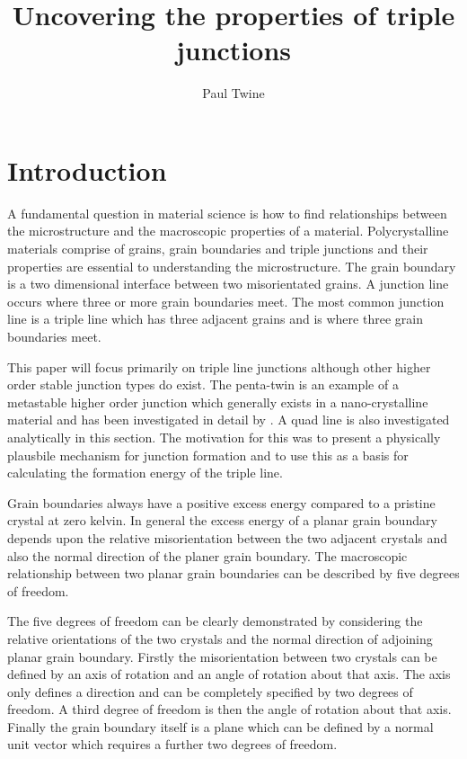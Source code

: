 \documentclass[12pt,a4paper]{book}
\title{Uncovering the properties of triple junctions}
\author{Paul Twine}
\begin{document}
\maketitle

\chapter{Introduction}

A fundamental question in material science is how to find relationships between the microstructure and the macroscopic properties of a material. Polycrystalline materials comprise of grains, grain boundaries and triple junctions and their properties are essential to understanding the microstructure. The grain boundary is a two dimensional interface between two misorientated grains. A junction line occurs where three or more grain boundaries meet. The most common junction line is a triple line which has three adjacent grains and is where three grain boundaries meet. 

This paper will focus primarily on triple line junctions although other higher order stable junction types do exist. The penta-twin is an example of a metastable higher order junction which generally exists in a nano-crystalline material and has been investigated in detail by \cite{Thomas2016}. A quad line is also investigated analytically in this section. The motivation for this was to present a physically plausbile mechanism for junction formation and to use this as a basis for calculating the formation energy of the triple line. 

Grain boundaries always have a positive excess energy compared to a pristine crystal at zero kelvin. In general the excess energy of a planar grain boundary depends upon the relative misorientation between the two adjacent crystals and also the normal direction of the planer grain boundary. The macroscopic relationship between two planar grain boundaries can be described by five degrees of freedom. 

The five degrees of freedom can be clearly demonstrated by considering the relative orientations of the two crystals and the normal direction of adjoining planar grain boundary. Firstly the misorientation between two crystals can be defined by an axis of rotation and an angle of rotation about that axis.  The axis only defines a direction and can be completely specified by two degrees of freedom. A third degree of freedom is then the angle of rotation about that axis. Finally the grain boundary itself is a plane which can be defined by a normal unit vector which requires a further two degrees of freedom.
\end{document}
